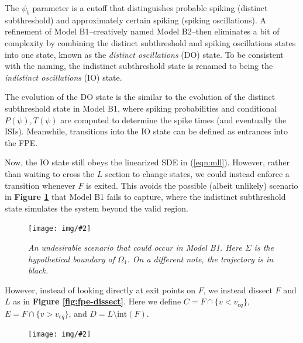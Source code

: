 \documentclass[letterpaper,12pt]{article}
\numberwithin{table}{section}
\numberwithin{figure}{section}
\numberwithin{equation}{section}
\newcommand{\centerfig}[2]{\begin{center}\texttt{[image: img/\#2]}\end{center}}
\newcommand{\ccaption}[1]{\caption{\textit{#1}}}
\newcommand{\reffig}[1]{\textbf{Figure \ref{#1}}}
\begin{document}
\begin{flushleft}

    The $\psi_b$ parameter is a cutoff that distinguishes probable spiking (distinct subthreshold) and approximately certain spiking (spiking oscillations). A refinement of Model B1--creatively named Model B2--then eliminates a bit of complexity by combining the distinct subthreshold and spiking oscillations states into one state, known as the \textit{distinct oscillations} (DO) state. To be consistent with the naming, the indistinct subthreshold state is renamed to being the \textit{indistinct oscillations} (IO) state.

    The evolution of the DO state is the similar to the evolution of the distinct subthreshold state in Model B1, where spiking probabilities and conditional $P(\psi), T(\psi)$ are computed to determine the spike times (and eventually the ISIs). Meanwhile, transitions into the IO state can be defined as entrances into the FPE.

    Now, the IO state still obeys the linearized SDE in (\ref{eqn:mll}). However, rather than waiting to cross the $L$ section to change states, we could instead enforce a transition whenever $F$ is exited. This avoids the possible (albeit unlikely) scenario in \reffig{fig:modelb1-fpe-fail} that Model B1 fails to capture, where the indistinct subthreshold state simulates the system beyond the valid region.
    \begin{figure}[h]

        \centering
 
        \centerfig{0.8}{modelb1-fpe-fail.jpg}
    
        \captionsetup{width=0.85\linewidth}
        \ccaption{An undesirable scenario that could occur in Model B1. Here $\Sigma$ is the hypothetical boundary of $\Omega_1$. On a different note, the trajectory is in black.}
        \label{fig:modelb1-fpe-fail}
    
    \end{figure}

    However, instead of looking directly at exit points on $F$, we instead dissect $F$ and $L$ as in         \reffig{fig:fpe-dissect}. Here we define $C = F \cap \{v < v_{eq}\}$, $E = F \cap \{v > v_{eq}\}$, and $D = L \setminus \text{int}(F)$.
    \begin{figure}[h]

        \centering
 
        \centerfig{0.6}{fpe-dissect.jpg}
    

\end{figure}
\end{flushleft}
\end{document}
